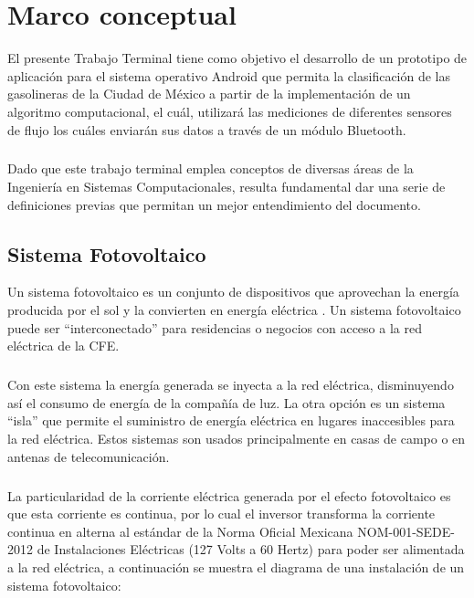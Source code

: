 
\chapter{Marco conceptual}\label{chapter2}
El presente Trabajo Terminal tiene como objetivo el desarrollo de un prototipo de aplicación para el sistema operativo Android que permita la clasificación de las gasolineras de la Ciudad de México a partir de la implementación de un algoritmo computacional, el cuál, utilizará las mediciones de diferentes sensores de flujo los cuáles enviarán sus datos a través de un módulo Bluetooth.
\paragraph{}
Dado que este trabajo terminal emplea conceptos de diversas áreas de la Ingeniería en Sistemas Computacionales, resulta fundamental dar una serie de definiciones previas que permitan un mejor entendimiento del documento.

\section{Sistema Fotovoltaico}
Un sistema fotovoltaico es un conjunto de dispositivos que aprovechan la energía producida por el sol y la convierten en energía eléctrica \citep{MarcoTeorico1}. Un sistema fotovoltaico puede ser “interconectado” para residencias o negocios con acceso a la red eléctrica de la CFE. 
\paragraph{}
Con este sistema la energía generada se inyecta a la red eléctrica, disminuyendo así el consumo de energía de la compañía de luz. La otra opción es un sistema “isla” que permite el suministro de energía eléctrica en lugares inaccesibles para la red eléctrica. Estos sistemas son usados principalmente en casas de campo o en antenas de telecomunicación.
\paragraph{}
La particularidad de la corriente eléctrica generada por el efecto fotovoltaico es que esta corriente es continua, por lo cual el inversor transforma la corriente continua en alterna al estándar de la Norma Oficial Mexicana NOM-001-SEDE-2012 de Instalaciones Eléctricas (127 Volts a 60 Hertz) \citep{NORMA-Electrica} para poder ser alimentada a la red eléctrica, a continuación se muestra el diagrama de una instalación de un sistema fotovoltaico:

